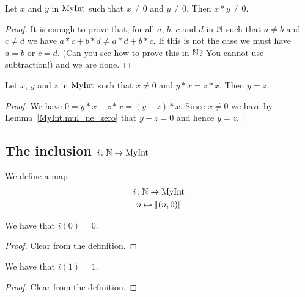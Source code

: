 \begin{lemma}
    \label{MyInt.mul_ne_zero}
    \leanok
Let $x$ and $y$ in $\mathrm{MyInt}$ such that $x \neq 0$ and $y \neq 0$. Then $x*y \neq 0$.
\end{lemma}
\begin{proof}
    \leanok
    It is enough to prove that, for all $a$, $b$, $c$ and $d$ in $\mathbb{N}$ such that $a \neq b$ and $c \neq d$ we have $a*c+b*d\neq a*d+b*c$. If this is not the case we must have $a = b$ or $c = d$. (Can you see how to prove this in $\mathbb{N}$? You cannot use subtraction!) and we are done.
\end{proof}

\begin{lemma}
    \label{MyInt.eq_of_mul_eq_mul_right}
    \leanok
Let $x$, $y$ and $z$ in $\mathrm{MyInt}$ such that $x \neq 0$ and $y * x = z * x$. Then $y = z$.
\end{lemma}
\begin{proof}
    \leanok
We have $0 = y*x-z*x=(y-z)*x$. Since $x \neq 0$ we have by Lemma~\ref{MyInt.mul_ne_zero} that $y-z=0$ and hence $y=z$.
\end{proof}

\subsection{\texorpdfstring{The inclusion $i \colon \mathbb{N} \to \mathrm{MyInt}$}{The inclusion}}
\begin{definition}
    \label{MyInt.i}
    \leanok
    We define a map
\begin{gather*}
    i \colon \mathbb{N} \to \mathrm{MyInt} \\
    n \mapsto \llbracket (n,0) \rrbracket
\end{gather*}
\end{definition}

\begin{lemma}
    \label{MyInt.i_zero}
    \leanok
We have that $i(0) = 0$.
\end{lemma}
\begin{proof}
    \leanok
Clear from the definition.
\end{proof}

\begin{lemma}
    \label{MyInt.i_one}
    \leanok
We have that $i(1) = 1$.
\end{lemma}
\begin{proof}
    \leanok
Clear from the definition.
\end{proof}

